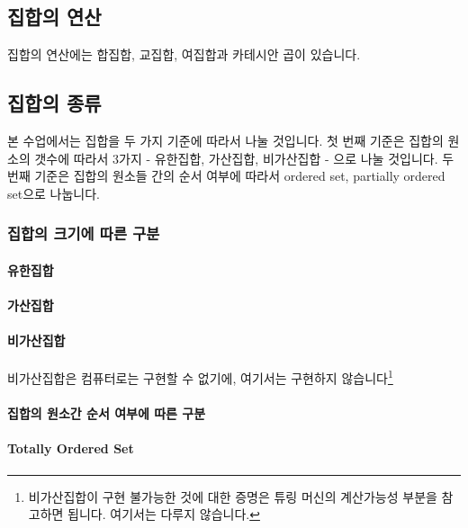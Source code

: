 \subsection{집합의 연산} 

집합의 연산에는 합집합, 교집합, 여집합과 카테시안 곱이 있습니다. 

\subsection{집합의 종류} 

본 수업에서는 집합을 두 가지 기준에 따라서 나눌 것입니다. 첫 번째 기준은 집합의 원소의 갯수에 따라서 3가지 - 유한집합, 가산집합, 비가산집합 - 으로 나눌 것입니다. 두 번째 기준은 집합의 원소들 간의 순서 여부에 따라서 ordered set, partially ordered set으로 나눕니다. 


\subsubsection{집합의 크기에 따른 구분} 

\paragraph{유한집합}

\paragraph{가산집합}

\paragraph{비가산집합} 
비가산집합은 컴퓨터로는 구현할 수 없기에, 여기서는 구현하지 않습니다\footnote{비가산집합이 구현 불가능한 것에 대한 증명은 튜링 머신의 계산가능성 부분을 참고하면 됩니다. 여기서는 다루지 않습니다.} 

\paragraph{집합의 원소간 순서 여부에 따른 구분}

\paragraph{Totally Ordered Set}

